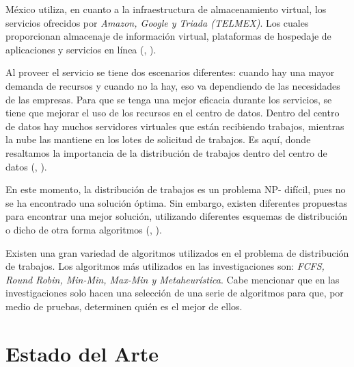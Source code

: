M\'exico utiliza, en cuanto a la infraestructura de almacenamiento virtual, los servicios ofrecidos por \textit{Amazon, Google y Triada (TELMEX)}. Los cuales proporcionan almacenaje de informaci\'on virtual, plataformas de hospedaje de aplicaciones y servicios en l\'inea (\citeauthor{mariscal2013computo}, \citeyear{mariscal2013computo}).

Al proveer el servicio se tiene dos escenarios diferentes: cuando hay una mayor demanda de recursos y cuando no la hay,  eso va dependiendo de las necesidades de las empresas. 
Para que se tenga una mejor eficacia durante los servicios, se tiene que mejorar el uso de los recursos en el centro de datos. Dentro del centro de datos hay muchos servidores virtuales que est\'an recibiendo trabajos, mientras la nube las mantiene en los lotes de solicitud de trabajos. Es aqu\'i, donde resaltamos la importancia de la distribuci\'on de trabajos dentro del centro de datos (\citeauthor{shimpy2014different}, \citeyear{shimpy2014different}). 

En este momento, la distribuci\'on de trabajos es un problema NP- dif\'icil, pues no se ha encontrado una soluci\'on \'optima. Sin embargo, existen diferentes propuestas para encontrar una mejor soluci\'on, utilizando diferentes esquemas de distribuci\'on o dicho de otra forma algoritmos (\citeauthor{shimpy2014different}, \citeyear{shimpy2014different}). 

Existen una gran variedad de algoritmos utilizados en el problema de distribuci\'on de trabajos. Los algoritmos m\'as utilizados en las investigaciones son: \textit{FCFS, Round Robin, Min-Min, Max-Min y Metaheur\'istica}. Cabe mencionar que en las investigaciones solo hacen una selecci\'on de una serie de algoritmos para que, por medio de pruebas, determinen qui\'en es el mejor de ellos. 


\newpage
\section{Estado del Arte}


